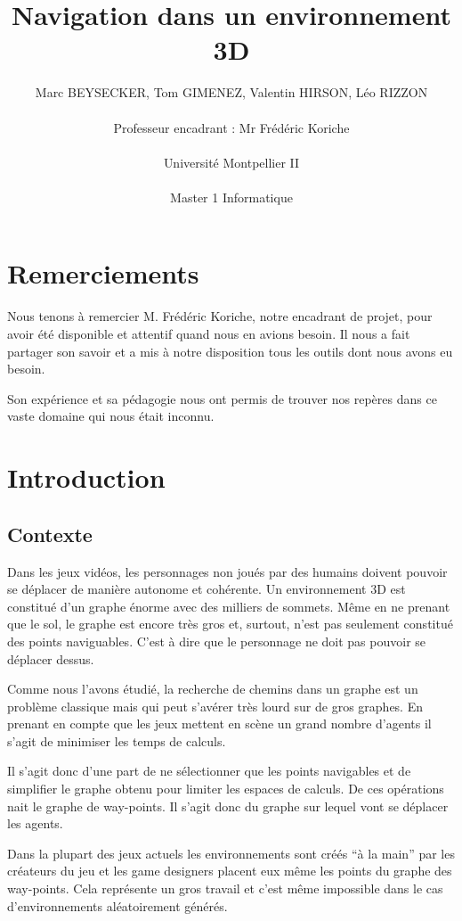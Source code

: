 \documentclass[a4paper,12pt]{report}
\title{Navigation dans un environnement 3D \vspace{0.5cm}}
\author{Marc BEYSECKER, Tom GIMENEZ, Valentin HIRSON, Léo RIZZON\\  \\Professeur encadrant : Mr Frédéric Koriche \\ \\Université Montpellier II \\  \\Master 1 Informatique}
\date{}
\begin{document}
\maketitle

\tableofcontents

\newpage

\chapter*{Remerciements}

Nous tenons à remercier M. Frédéric Koriche, notre encadrant de projet, pour avoir été disponible et attentif quand nous en avions besoin. Il nous a fait partager son savoir et a mis à notre disposition tous les outils dont nous avons eu besoin.

Son expérience et sa pédagogie nous ont permis de trouver nos repères dans ce vaste domaine qui nous était inconnu.

\chapter{Introduction}


\section*{Contexte}

Dans les jeux vidéos, les personnages non joués par des humains doivent pouvoir se déplacer de manière autonome et cohérente. Un environnement 3D est constitué d'un graphe énorme avec des milliers de sommets. Même en ne prenant que le sol, le graphe est encore très gros et, surtout, n'est pas seulement constitué des points naviguables. C'est à dire que le personnage ne doit pas pouvoir se déplacer dessus.

Comme nous l'avons étudié, la recherche de chemins dans un graphe est un problème classique mais qui peut s'avérer très lourd sur de gros graphes. En prenant en compte que les jeux mettent en scène un grand nombre d'agents il s'agit de minimiser les temps de calculs. 

Il s'agit donc d'une part de ne sélectionner que les points navigables et de simplifier le graphe obtenu pour limiter les espaces de calculs. De ces opérations nait le graphe de way-points. Il s'agit donc du graphe sur lequel vont se déplacer les agents.

Dans la plupart des jeux actuels les environnements sont créés ``à la main'' par les créateurs du jeu et les game designers placent eux même les points du graphe des way-points. Cela représente un gros travail et c'est même impossible dans le cas d'environnements aléatoirement générés.
\end{document}
